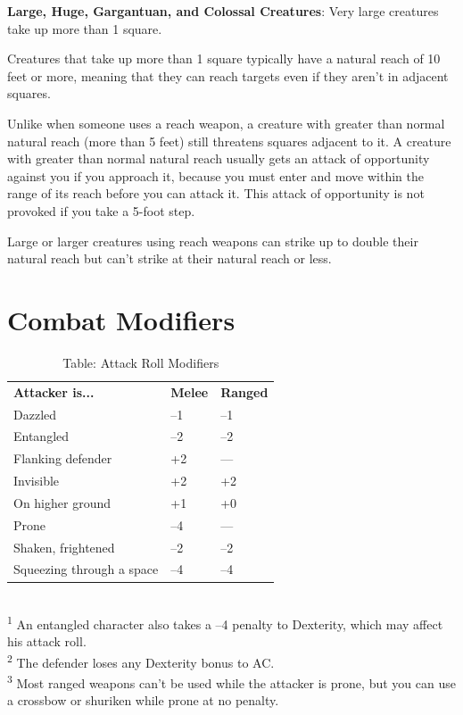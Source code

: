 \textbf{Large, Huge, Gargantuan, and Colossal Creatures}: Very large creatures take up more than 1 square.
				
Creatures that take up more than 1 square typically have a natural reach of 10 feet or more, meaning that they can reach targets even if they aren't in adjacent squares.
				
Unlike when someone uses a reach weapon, a creature with greater than normal natural reach (more than 5 feet) still threatens squares adjacent to it. A creature with greater than normal natural reach usually gets an attack of opportunity against you if you approach it, because you must enter and move within the range of its reach before you can attack it. This attack of opportunity is not provoked if you take a 5-foot step.
				
Large or larger creatures using reach weapons can strike up to double their natural reach but can't strike at their natural reach or less. 
				
\section{Combat Modifiers}


\begin{table}[]
\sffamily
\caption{Table: Attack Roll Modifiers}
\begin{tabular}{lll}
\textbf{Attacker is...} & \textbf{Melee} & \textbf{Ranged}\\
Dazzled & --1 & --1\\
Entangled & --2 & --2\\
Flanking defender & +2 & —\\
Invisible & +2 & +2\\
On higher ground & +1 & +0\\
Prone & --4 & —\\
Shaken, frightened & --2 & --2\\
Squeezing through a space & --4 & --4\\
\end{tabular}\\
\textsuperscript{1} An entangled character also takes a --4 penalty to Dexterity, which may affect his attack roll.\\
\textsuperscript{2} The defender loses any Dexterity bonus to AC.\\
\textsuperscript{3} Most ranged weapons can't be used while the attacker is prone, but you can use a crossbow or shuriken while prone at no penalty.\\
\end{table}

